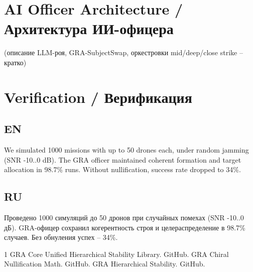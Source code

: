 \documentclass[a4paper,12pt]{article}
\begin{document}
\section{AI Officer Architecture / Архитектура ИИ-офицера}
(описание LLM-роя, GRA-SubjectSwap, оркестровки mid/deep/close strike -- кратко)

\section{Verification / Верификация}
\subsection*{EN}
We simulated 1000 missions with up to 50 drones each, under random jamming (SNR -10..0 dB). The GRA officer maintained coherent formation and target allocation in 98.7\% runs. Without nullification, success rate dropped to 34\%.

\subsection*{RU}
Проведено 1000 симуляций до 50 дронов при случайных помехах (SNR -10..0 дБ). GRA-офицер сохранил когерентность строя и целераспределение в 98.7\% случаев. Без обнуления успех -- 34\%.

\begin{thebibliography}{1}
 GRA Core Unified Hierarchical Stability Library. GitHub.
 GRA Chiral Nullification Math. GitHub.
 GRA Hierarchical Stability. GitHub.
\end{thebibliography}
\end{document}
